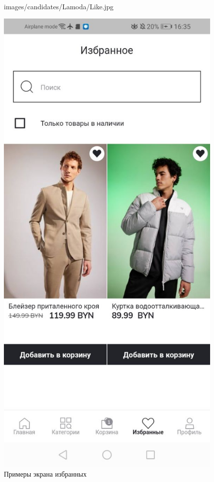 \begin{figure}[!p]
\begin{minipage}{0.16\textwidth}
    {images/candidates/Lamoda/Like.jpg}
  \end{minipage}
  \begin{minipage}{0.16\textwidth}
    \includegraphics[width=.99\linewidth]
    {images/candidates/DeFacto/Like.jpg}
  \end{minipage}

  \caption{Примеры экрана избранных}\label{fig:analyzLike}
\end{figure}


